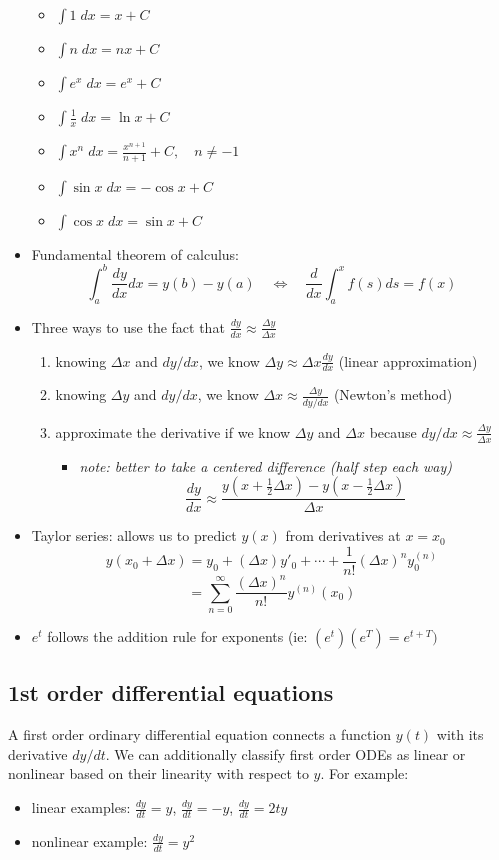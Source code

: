 \documentclass{article}
\begin{document}
\begin{multicols*}{2}
\begin{itemize}
\begin{itemize}
        \item $\int 1 \;dx = x + C$
        \item $\int n \;dx = nx + C$
        \item $\int e^x \;dx = e^x + C$
        \item $\int \frac{1}{x} \;dx = \ln{x} +C$
        \item $\int x^n \;dx = \frac{x^{n+1}}{n+1} + C, \quad n \neq -1$
        \item $\int \sin{x} \; dx = -\cos{x} + C$
        \item $\int \cos{x} \; dx = \sin{x} + C$
    \end{itemize}
\item Fundamental theorem of calculus:
    $$ \int_a^b\frac{dy}{dx}dx=y(b)-y(a) \quad \iff \quad \frac{d}{dx}\int_a^x f(s)ds = f(x) $$
\item Three ways to use the fact that $\frac{dy}{dx} \approx \frac{\Delta y}{\Delta x}$
\begin{enumerate}[label=\alph*.]
    \item knowing $\Delta x$ and $dy/dx$, we know $\Delta y \approx \Delta x \frac{dy}{dx}$ (linear approximation)
    \item knowing $\Delta y$ and $dy/dx$, we know $\Delta x \approx \frac{\Delta y}{dy/dx}$ (Newton's method)
    \item approximate the derivative if we know $\Delta y$ and $\Delta x$ because $dy/dx \approx \frac{\Delta y}{\Delta x}$
     \begin{itemize}
         \item \emph{note: better to take a centered difference (half step each way)}
             \[ \frac{dy}{dx} \approx \frac{y(x+\frac{1}{2}\Delta x) - y(x-\frac{1}{2} \Delta x)}{\Delta x}\]
 \end{itemize}
\end{enumerate}
\item Taylor series: allows us to predict $y(x)$ from derivatives at $x = x_0$
    \[ y(x_0 + \Delta x) = y_0 + (\Delta x)y'_0 + \cdots  + \frac{1}{n!}(\Delta x)^n y_0^{(n)} \] 
    \[ = \sum_{n=0}^{\infty} \frac{(\Delta x)^n}{n!}y^{(n)}(x_0) \]
\item $e^t$ follows the addition rule for exponents (ie: $(e^t)(e^T) = e^{t+T})$
\end{itemize}

\subsection{1st order differential equations}
A first order ordinary differential equation connects a function $y(t)$ with its derivative $dy/dt$. We can additionally classify first order ODEs as linear or nonlinear based on their linearity with respect to $y$. For example:
\begin{itemize}
    \item linear examples: $\frac{dy}{dt} = y$, $\frac{dy}{dt} = -y$, $\frac{dy}{dt} = 2ty$
    \item nonlinear example: $\frac{dy}{dt} = y^2$
\end{itemize}


\end{multicols*}
\end{document}
